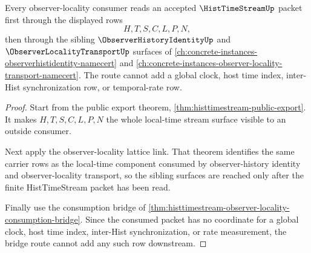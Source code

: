 \begin{theorem}
\label{thm:histtimestream-observer-locality-bridge-route}
Every observer-locality consumer reads an accepted $\HistTimeStreamUp$ packet first through the displayed rows
$$
H,T,S,C,L,P,N,
$$
then through the sibling $\ObserverHistoryIdentityUp$ and $\ObserverLocalityTransportUp$ surfaces of \autoref{ch:concrete-instances-observerhistidentity-namecert} and \autoref{ch:concrete-instances-observer-locality-transport-namecert}. The route cannot add a global clock, host time index, inter-Hist synchronization row, or temporal-rate row.
\end{theorem}
\begin{proof}
Start from the public export theorem, \autoref{thm:histtimestream-public-export}. It makes $H,T,S,C,L,P,N$ the whole local-time stream surface visible to an outside consumer.

Next apply the observer-locality lattice link. That theorem identifies the same carrier rows as the local-time component consumed by observer-history identity and observer-locality transport, so the sibling surfaces are reached only after the finite HistTimeStream packet has been read.

Finally use the consumption bridge of \autoref{thm:histtimestream-observer-locality-consumption-bridge}. Since the consumed packet has no coordinate for a global clock, host time index, inter-Hist synchronization, or rate measurement, the bridge route cannot add any such row downstream.
\end{proof}

